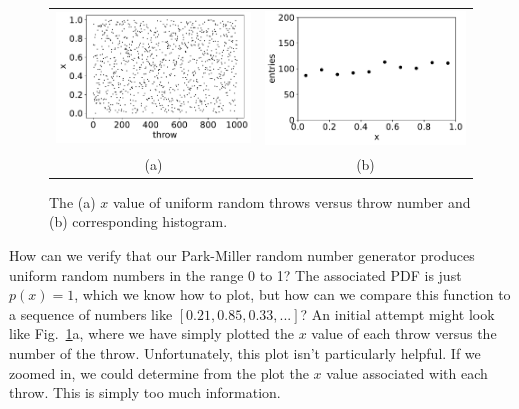 \begin{figure}[htbp]
 \begin{center}
 \begin{tabular}{cc}   
  \includegraphics[height=0.22\textheight]{figs/labs/monte_carlo/flat2d.pdf} &
  \includegraphics[height=0.22\textheight]{figs/labs/monte_carlo/flathist.pdf} \\
  (a) & (b) \\
 \end{tabular}
\caption{The (a) $x$ value of uniform random throws versus throw number and (b) corresponding histogram. }
\label{fig:flathist}
\end{center}
\end{figure}

\noindent
How can we verify that our Park-Miller random number generator
produces uniform random numbers in the range 0 to 1?  The associated
PDF is just $p(x)=1$, which we know how to plot, but how can we
compare this function to a sequence of numbers like $[0.21, 0.85,
  0.33, ...]$?  An initial attempt might look like
Fig.~\ref{fig:flathist}a, where we have simply plotted the $x$ value
of each throw versus the number of the throw.  Unfortunately, this
plot isn't particularly helpful.  If we zoomed in, we could determine
from the plot the $x$ value associated with each throw.  This is
simply too much information.

